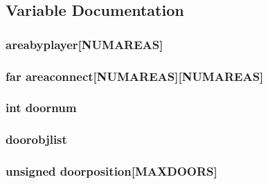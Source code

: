 \subsection{Variable Documentation}
\hypertarget{WL__ACT1_8C_a59682b519d59a900dd195516111d7cc4}{
\subsubsection[{areabyplayer}]{ {\bf areabyplayer}\mbox{[}NUMAREAS\mbox{]}}}
\label{WL__ACT1_8C_a59682b519d59a900dd195516111d7cc4}
\hypertarget{WL__ACT1_8C_a508c3e1ce5df30e83a5b0d8711d6422b}{
\subsubsection[{areaconnect}]{ far {\bf areaconnect}\mbox{[}NUMAREAS\mbox{]}\mbox{[}NUMAREAS\mbox{]}}}
\label{WL__ACT1_8C_a508c3e1ce5df30e83a5b0d8711d6422b}
\hypertarget{WL__ACT1_8C_a270ac0143523da1acaf3ad63e7c9f103}{
\subsubsection[{doornum}]{\setlength{\rightskip}{0pt plus 5cm}int {\bf doornum}}}
\label{WL__ACT1_8C_a270ac0143523da1acaf3ad63e7c9f103}
\hypertarget{WL__ACT1_8C_a1db92e07e7d240d5f227fa9125a7a607}{
\subsubsection[{doorobjlist}]{ {\bf doorobjlist}}}
\label{WL__ACT1_8C_a1db92e07e7d240d5f227fa9125a7a607}
\hypertarget{WL__ACT1_8C_a40e94301053d665ef509efdce52da5cb}{
\subsubsection[{doorposition}]{\setlength{\rightskip}{0pt plus 5cm}unsigned {\bf doorposition}\mbox{[}MAXDOORS\mbox{]}}}

